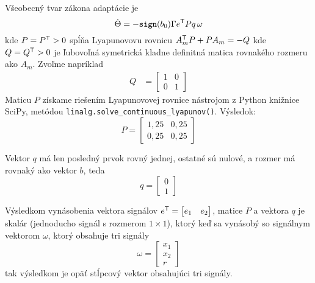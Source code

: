 \documentclass[a4paper, 10pt, ]{article}
\begin{document}
Všeobecný tvar zákona adaptácie je
\begin{equation}
	\dot \Theta = - \texttt{sign}(b_0) \Gamma e^{\mathsf{T}} P q \, \omega
\end{equation}
kde $P = P^{\mathsf{T}} > 0$ spĺňa Lyapunovovu rovnicu $ A_m^{\mathsf{T}} P + P A_m = - Q$ kde $Q = Q^{\mathsf{T}} > 0$ je ľubovoľná symetrická kladne definitná matica rovnakého rozmeru ako $A_m$. Zvoľme napríklad
\begin{align*}
	 Q &= \begin{bmatrix} 1 & 0\\ 0& 1 \end{bmatrix}
\end{align*}
Maticu $P$ získame riešením Lyapunovovej rovnice nástrojom z Python knižnice SciPy, metódou \lstinline{linalg.solve_continuous_lyapunov()}. Výsledok:
\begin{equation}
	P = \begin{bmatrix} 1,25 &  0,25 \\   0,25  &  0,25 \end{bmatrix}
\end{equation}

Vektor $q$ má len posledný prvok rovný jednej, ostatné sú nulové, a rozmer má rovnaký ako vektor $b$, teda
\begin{equation}
	q = \begin{bmatrix} 0 \\ 1 \end{bmatrix}
\end{equation}

Výsledkom vynásobenia vektora signálov $e^{\mathsf{T}} = \begin{bmatrix} e_1 & e_2 \end{bmatrix}$, matice $P$ a vektora $q$ je skalár (jednoducho signál s rozmerom $1 \times 1$), ktorý keď sa vynásobý so  signálnym vektorom $\omega$, ktorý obsahuje tri signály
\begin{equation}
	\omega = \begin{bmatrix} x_1 \\ x_2 \\ r \end{bmatrix}
\end{equation}
tak výsledkom je opäť stĺpcový vektor obsahujúci tri signály.
\end{document}
